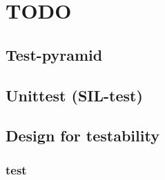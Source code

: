 \documentclass{beamer}
\begin{document}
\section{TODO}
\subsection{Test-pyramid}
\begin{frame}

\end{frame}

\subsection{Unittest (SIL-test)}
\begin{frame}

\end{frame}

\subsection{Design for testability}
\begin{frame}

\end{frame}

\subsubsection{test}
\begin{frame}

\end{frame}
\end{document}
